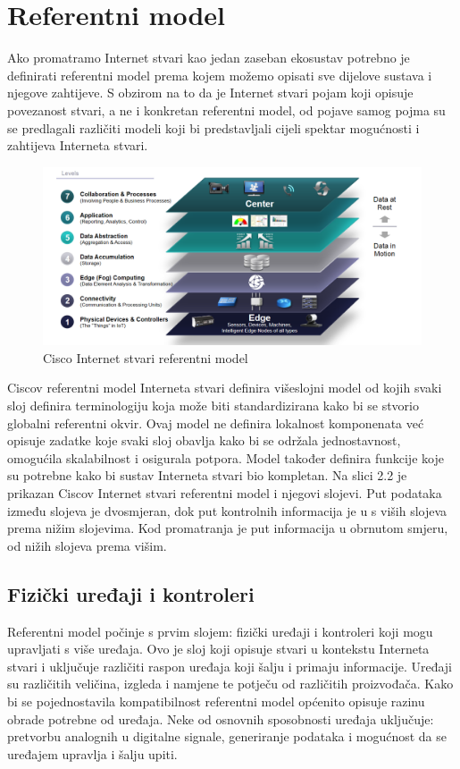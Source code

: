 \documentclass[times, utf8, diplomski]{fer}
\begin{document}
\section{Referentni model}
Ako promatramo Internet stvari kao jedan zaseban ekosustav potrebno je definirati referentni model prema kojem možemo opisati sve dijelove sustava i njegove zahtijeve. S obzirom na to da je Internet stvari pojam koji opisuje povezanost stvari, a ne i konkretan referentni model, od pojave samog pojma su se predlagali različiti modeli koji bi predstavljali cijeli spektar mogućnosti i zahtijeva Interneta stvari. 
\begin{figure}[htb]
    \centering
    \includegraphics[width=14cm]{images/ciscomodel.png}
    \caption{Cisco Internet stvari referentni model\citep{CiscoIotModel}}
    \label{fig:ciscomodel}
\end{figure}

Ciscov referentni model Interneta stvari\citep{CiscoIotModel} definira višeslojni model od kojih svaki sloj definira terminologiju koja može biti standardizirana kako bi se stvorio globalni referentni okvir. Ovaj model ne definira lokalnost komponenata već opisuje zadatke koje svaki sloj obavlja kako bi se održala jednostavnost, omogućila skalabilnost i osigurala potpora. Model također definira funkcije koje su potrebne kako bi sustav Interneta stvari bio kompletan. Na slici 2.2 je prikazan Ciscov Internet stvari referentni model i njegovi slojevi. Put podataka između slojeva je dvosmjeran, dok put kontrolnih informacija je u s viših slojeva prema nižim slojevima. Kod promatranja je put informacija u obrnutom smjeru, od nižih slojeva prema višim. 

\subsection{Fizički uređaji i kontroleri}
Referentni model počinje s prvim slojem: fizički uređaji i kontroleri koji mogu upravljati s više uređaja. Ovo je sloj koji opisuje stvari u kontekstu Interneta stvari i uključuje različiti raspon uređaja koji šalju i primaju informacije. Uređaji 
su različitih veličina, izgleda i namjene te potječu od različitih proizvođača. Kako bi se pojednostavila kompatibilnost referentni model općenito opisuje razinu obrade potrebne od uređaja. Neke od osnovnih sposobnosti uređaja uključuje: pretvorbu analognih u digitalne signale, generiranje podataka i mogućnost da se uređajem upravlja i šalju upiti.
\end{document}
